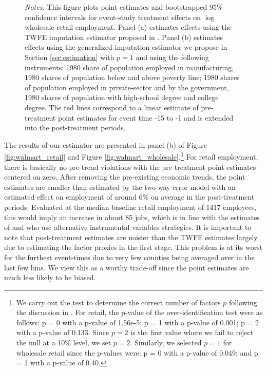 \documentclass[12pt]{article}
\begin{document}
\begin{figure}
{\footnotesize \emph{Notes.} This figure plots point estimates and bootstrapped 95\% confidence intervals for event-study treatment effects on $\log$ wholesale retail employment. Panel (a) estimates effects using the TWFE imputation estimator proposed in \citet{Borusyak_Jaravel_Spiess_2021}. Panel (b) estimates effects using the generalized imputation estimator we propose in Section \ref{sec:estimation} with $p = 1$ and using the following instruments: 1980 share of population employed in manufacturing, 1980 shares of population below and above poverty line; 1980 shares of population employed in private-sector and by the government, 1980 shares of population with high-school degree and college degree. The red lines correspond to a linear estimate of pre-treatment point estimates for event time -15 to -1 and is extended into the post-treatment periods.}
\end{figure}

The results of our estimator are presented in panel (b) of Figure \ref{fig:walmart_retail} and Figure \ref{fig:walmart_wholesale}.\footnote{We carry out the test to determine the correct number of factors $p$ following the discussion in \citet{Ahn_Lee_Schmidt_2013}. For retail, the p-value of the over-identification test were as follows: p = 0 with a p-value of 1.56e-5; p = 1 with a p-value of 0.001; p = 2 with a p-value of 0.133.  Since $p = 2$ is the first value where we fail to reject the null at a 10\% level, we set $p = 2$. Similarly, we selected $p = 1$ for wholesale retail since the p-values were: p = 0 with a p-value of 0.049; and p = 1 with a p-value of 0.40.} For retail employment, there is basically no pre-trend violations with the pre-treatment point estimates centered on zero. After removing the pre-existing economic trends, the point estimates are smaller than estimated by the two-way error model with an estimated effect on employment of around 6\% on average in the post-treatment periods. Evaluated at the median baseline retail employment of 1417 employees, this would imply an increase in about 85 jobs, which is in line with the estimates of \citet{basker2005job} and \citet{stapp2014Walmart} who use alternative instrumental variables strategies. It is important to note that post-treatment estimates are noisier than the TWFE estimates largely due to estimating the factor proxies in the first stage. This problem is at its worst for the furthest event-times due to very few counties being averaged over in the last few bins. We view this as a worthy trade-off since the point estimates are much less likely to be biased. 
\end{document}
